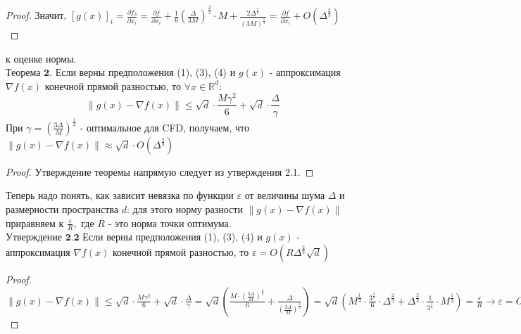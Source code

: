 \documentclass{article}
\begin{document}
\begin{doublespace}
\begin{proof}
Значит, $[g(x)]_i  = \frac{\partial f_{\delta}}{\partial x_{i}} = \frac{\partial f}{\partial x_i} + \frac{1}{6} (\frac{\Delta}{3 M})^{\frac{2}{3}} \cdot M + \frac{2 \Delta^{\frac{2}{3}}}{(3 M)^{\frac{1}{3}}} = \frac{\partial f}{\partial x_i} + O(\Delta^{\frac{2}{3}})$\\
\end{proof}
 к оценке нормы.\\
$\textbf{Теорема 2.}$ Если верны предположения (1), (3), (4) и $g(x)$ - аппроксимация $\nabla f(x)$ конечной прямой разностью, то $\forall x \in \mathds{R}^d$:$$\|g(x)-\nabla f(x)\|\leq \sqrt{d}\cdot\frac{M \gamma^2}{6}+\sqrt{d}\cdot\frac{\Delta}{\gamma} $$
При $\gamma = (\frac{3 \Delta}{M})^{\frac{1}{3}}$ - оптимальное для CFD, получаем, что  $\|g(x)-\nabla f(x)\| \approx \sqrt{d} \cdot O(\Delta^{\frac{2}{3}})$
\begin{proof}
Утверждение теоремы напрямую следует из утверждения 2.1.
\end{proof}
\noindent Теперь надо понять, как зависит невязка по функции  $\varepsilon$ от величины шума $\Delta$ и размерности пространства $d$: для этого норму разности $\|g(x) - \nabla f(x) \|$ приравняем к $\frac{\varepsilon}{R},$ где $R$ - это норма точки оптимума.\\
$\textbf{Утверждение 2.2}$ Если верны предположения (1), (3), (4) и $g(x)$ - аппроксимация $\nabla f(x)$ конечной прямой разностью, то $\varepsilon = O(R \Delta^{\frac{2}{3}} \sqrt{d})$
\begin{proof}
$\|g(x) - \nabla f(x) \| \leq \sqrt{d} \cdot \frac{M \gamma^2}{6} + \sqrt{d} \cdot \frac{\Delta}{\gamma} = \sqrt{d} ( \frac{M \cdot (\frac{3 \Delta}{M})^{\frac{2}{3}}}{6} + \frac{\Delta}{(\frac{3 \Delta}{M})^{\frac{1}{3}}} ) = \sqrt{d} (M^{\frac{1}{3}} \cdot \frac{3^{\frac{2}{3}}}{6} \cdot \Delta^{\frac{2}{3}} + \Delta^{\frac{2}{3}} \cdot \frac{1}{3^{\frac{1}{3}}} \cdot M^{\frac{1}{3}}) = \frac{\varepsilon}{R} \xrightarrow[]{} \varepsilon = O(R \Delta^{\frac{2}{3}} \sqrt{d})$
\end{proof}
\end{doublespace}
\end{document}

